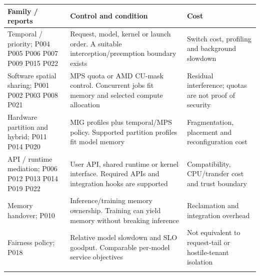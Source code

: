 \begin{longtable}{>{\raggedright\arraybackslash}p{}>{\raggedright\arraybackslash}p{}>{\raggedright\arraybackslash}p{}}
\toprule
\textbf{Family / reports} & \textbf{Control and condition} & \textbf{Cost}\\\midrule\endhead
Temporal / priority; P004 P005 P006 P007 P009 P015 P022 & Request, model, kernel or launch order. A suitable interception/preemption boundary exists & Switch cost, profiling and background slowdown\\\addlinespace
Software spatial sharing; P001 P002 P003 P008 P021 & MPS quota or AMD CU-mask control. Concurrent jobs fit memory and selected compute allocation & Residual interference; quotas are not proof of security\\\addlinespace
Hardware partition and hybrid; P011 P014 P020 & MIG profiles plus temporal/MPS policy. Supported partition profiles fit model memory & Fragmentation, placement and reconfiguration cost\\\addlinespace
API / runtime mediation; P006 P012 P013 P014 P019 P022 & User API, shared runtime or kernel interface. Required APIs and integration hooks are supported & Compatibility, CPU/transfer cost and trust boundary\\\addlinespace
Memory handover; P010 & Inference/training memory ownership. Training can yield memory without breaking inference & Reclamation and integration overhead\\\addlinespace
Fairness policy; P018 & Relative model slowdown and SLO goodput. Comparable per-model service objectives & Not equivalent to request-tail or hostile-tenant isolation\\\addlinespace
\bottomrule\end{longtable}